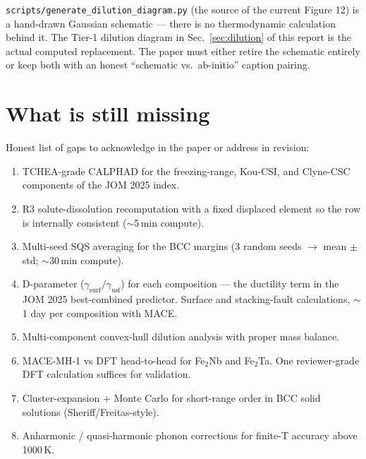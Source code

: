 \documentclass[11pt,a4paper]{article}
\begin{document}
\begin{caveatbox}[title=Critical: Figure 12 in the manuscript is a hand-drawn schematic]
\texttt{scripts/generate\_dilution\_diagram.py} (the source of the current
Figure 12) is a hand-drawn Gaussian schematic --- there is no thermodynamic
calculation behind it. The Tier-1 dilution diagram in
Sec.~\ref{sec:dilution} of this report is the actual computed
replacement. The paper must either retire the schematic entirely or keep
both with an honest ``schematic vs.\ ab-initio'' caption pairing.
\end{caveatbox}

\section{What is still missing}

Honest list of gaps to acknowledge in the paper or address in revision:

\begin{enumerate}[1.]
  \item TCHEA-grade CALPHAD for the freezing-range, Kou-CSI, and Clyne-CSC
        components of the JOM 2025 index.
  \item R3 solute-dissolution recomputation with a fixed displaced element so
        the row is internally consistent ($\sim$5\,min compute).
  \item Multi-seed SQS averaging for the BCC margins (3 random seeds $\to$
        mean $\pm$ std; $\sim$30\,min compute).
  \item D-parameter ($\gamma_{\text{surf}}/\gamma_{\text{usf}}$) for each
        composition --- the ductility term in the JOM 2025 best-combined
        predictor. Surface and stacking-fault calculations, $\sim$1 day per
        composition with MACE.
  \item Multi-component convex-hull dilution analysis with proper mass
        balance.
  \item MACE-MH-1 vs DFT head-to-head for Fe$_2$Nb and Fe$_2$Ta. One
        reviewer-grade DFT calculation suffices for validation.
  \item Cluster-expansion + Monte Carlo for short-range order in BCC solid
        solutions (Sheriff/Freitas-style).
  \item Anharmonic / quasi-harmonic phonon corrections for finite-T accuracy
        above 1000\,K.
\end{enumerate}
\end{document}
